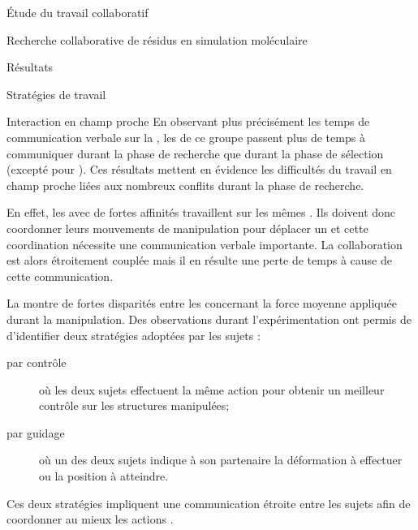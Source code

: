 \documentclass[myfrancais]{mythesis}
\begin{document}
\begin{mypart}{Étude du travail collaboratif}
\begin{mychapter}{Recherche collaborative de résidus en simulation moléculaire}
\begin{mysection}{Résultats}
\begin{mysubsection}{Stratégies de travail}
\begin{mysubsubsection}{Interaction en champ proche}
						En observant plus précisément les temps de communication verbale sur la , les  de ce groupe passent plus de temps à communiquer durant la phase de recherche que durant la phase de sélection (excepté pour ).
						Ces résultats mettent en évidence les difficultés du travail en champ proche liées aux nombreux conflits durant la phase de recherche.

						En effet, les  avec de fortes affinités travaillent sur les mêmes .
						Ils doivent donc coordonner leurs mouvements de manipulation pour déplacer un  et cette coordination nécessite une communication verbale importante.
						La collaboration est alors étroitement couplée mais il en résulte une perte de temps à cause de cette communication.

						La  montre de fortes disparités entre les  concernant la force moyenne appliquée durant la manipulation.
						Des observations durant l'expérimentation ont permis de d'identifier deux stratégies adoptées par les sujets :
						\begin{description}
							\item[par contrôle] où les deux sujets effectuent la même action pour obtenir un meilleur contrôle sur les structures manipulées;
							\item[par guidage] où un des deux sujets indique à son partenaire la déformation à effectuer ou la position à atteindre.
						\end{description}
						Ces deux stratégies impliquent une communication étroite entre les sujets afin de coordonner au mieux les actions .


\end{mysubsubsection}
\end{mysubsection}
\end{mysection}
\end{mychapter}
\end{mypart}
\end{document}

